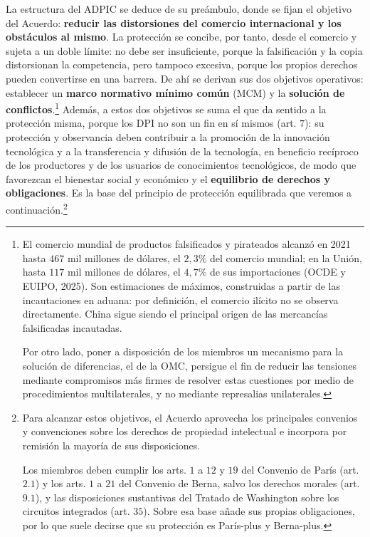 \documentclass[10pt,a4paper]{article}
\begin{document}
La estructura del ADPIC se deduce de su preámbulo, donde se fijan el objetivo del Acuerdo: \textbf{reducir las distorsiones del comercio internacional y los obstáculos al mismo}. La protección se concibe, por tanto, desde el comercio y sujeta a un doble límite: no debe ser insuficiente, porque la falsificación y la copia distorsionan la competencia, pero tampoco excesiva, porque los propios derechos pueden convertirse en una barrera. De ahí se derivan sus dos objetivos operativos: establecer un \textbf{marco normativo mínimo común} (MCM) y la \textbf{solución de conflictos}.\footnote{%
  El comercio mundial de productos falsificados y pirateados alcanzó en 2021 hasta $467$ mil millones de dólares, el $2,3\%$ del comercio mundial; en la Unión, hasta $117$ mil millones de dólares, el $4,7\%$ de sus importaciones (OCDE y EUIPO, 2025). Son estimaciones de máximos, construidas a partir de las incautaciones en aduana: por definición, el comercio ilícito no se observa directamente. China sigue siendo el principal origen de las mercancías falsificadas incautadas.

  Por otro lado, poner a disposición de los miembros un mecanismo para la solución de diferencias, el de la OMC, persigue el fin de reducir las tensiones mediante compromisos más firmes de resolver estas cuestiones por medio de procedimientos multilaterales, y no mediante represalias unilaterales.  
} Además, a estos dos objetivos se suma el que da sentido a la protección misma, porque los DPI no son un fin en sí mismos (art. $7$): su protección y observancia deben contribuir a la promoción de la innovación tecnológica y a la transferencia y difusión de la tecnología, en beneficio recíproco de los productores y de los usuarios de conocimientos tecnológicos, de modo que favorezcan el bienestar social y económico y el \textbf{equilibrio de derechos y obligaciones}. Es la base del principio de protección equilibrada que veremos a continuación.\footnote{%
  Para alcanzar estos objetivos, el Acuerdo aprovecha los principales convenios y convenciones sobre los derechos de propiedad intelectual e incorpora por remisión la mayoría de sus disposiciones.

  Los miembros deben cumplir los arts. $1$ a $12$ y $19$ del Convenio de París (art. $2.1$) y los arts. $1$ a $21$ del Convenio de Berna, salvo los derechos morales (art. $9.1$), y las disposiciones sustantivas del Tratado de Washington sobre los circuitos integrados (art. $35$). Sobre esa base añade sus propias obligaciones, por lo que suele decirse que su protección es París-plus y Berna-plus.
} 
\end{document}
